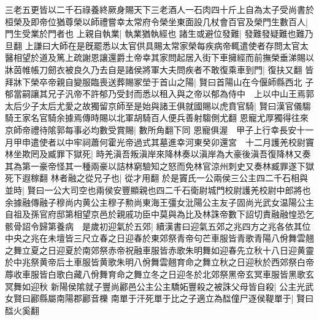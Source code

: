 三老五更皆以二千石祿養終厥身賜天下三老酒人一石肉四十斤上自為太子受尚書於桓榮及即帝位猶尊榮以師禮嘗幸太常府令榮坐東面設几杖會百官及榮門生數百人|{
	門生受業於門者也}
上親自執業|{
	執業猶執經也}
諸生或避位發難|{
	發難發疑難也難乃旦翻}
上謙曰大師在是旣罷悉以太官供具賜太常家榮每疾病帝輒遣使者存問太官太醫相望於道及篤上疏謝恩讓還爵土帝幸其家問起居入街下車擁經而前撫榮垂涕賜以牀茵帷帳刀劒衣被良久乃去自是諸侯將軍大夫問疾者不敢復乘車到門|{
	復扶又翻}
皆拜牀下榮卒帝親自變服臨喪送葬賜冢塋于首山之陽|{
	賢曰首陽山在今偃師縣西北}
子郁當嗣讓其兄子汎帝不許郁乃受封而悉以租入與之帝以郁為侍中　上以中山王焉郭太后少子太后尤愛之故獨留京師至是始與諸王俱就國賜以虎賁官騎|{
	賢曰漢官儀騶騎王家名官騎余據焉傳時賜以北軍胡騎百人便兵善射騶側尤翻}
恩寵尤厚獨得往來京師帝禮待隂郭每事必均數受賞賜|{
	數所角翻下同}
恩寵俱渥　甲子上行幸長安十一月甲申遣使者以中牢祠蕭何霍光帝過式其墓進幸河東癸卯還宮　十二月護羌校尉竇林坐欺罔及臧罪下獄死|{
	時羌滇吾叛滇岸來降林奏以滇岸為大豪後滇吾復降林又奏其為第一豪帝怪其一種兩豪以詰林窮驗知之怒而免林官涼州刺史又奏林臧罪遂下獄死下遐稼翻}
林者融之從兄子也|{
	從才用翻}
於是竇氏一公兩侯三公主四二千石相與並時|{
	賢曰一公大司空也兩侯安豐顯親也四二千石衛尉城門校尉護羌校尉中郎將也余據融傳融子穆尚内黄公主穆子勲尚東海王彊女沘陽公主友子固尚光武女温陽公主}
自祖及孫官府邸第相望京邑於親戚功臣中莫與為比及林誅帝數下詔切責融融惶恐乞骸骨詔令歸第養病　是歲初迎氣於五郊|{
	續漢書曰迎氣五郊之兆四方之兆各依其位中央之兆在未壇皆三尺立春之日迎春於東郊祭青帝句芒車服皆青歌青陽八佾舞雲翹之舞立夏之日迎夏於南郊祭赤帝祝融車服皆赤歌朱明舞如迎春先立秋十八日迎黄靈於中兆祭黄帝后土車服皆黄歌朱明八佾舞雲翹育命之舞立秋之日迎秋於西郊祭白帝蓐收車服皆白歌白藏八佾舞育命之舞立冬之日迎冬於北郊祭黑帝玄冥車服皆黑歌玄冥舞如迎秋}
新陽侯隂就子豐尚酈邑公主公主驕妬豐殺之被誅父母皆自殺|{
	公主光武女賢曰酈縣屬南陽郡酈音櫟}
南單于汗死單于比之子適立為䤈僮尸逐侯鞮單于|{
	賢曰䤈火奚翻}


